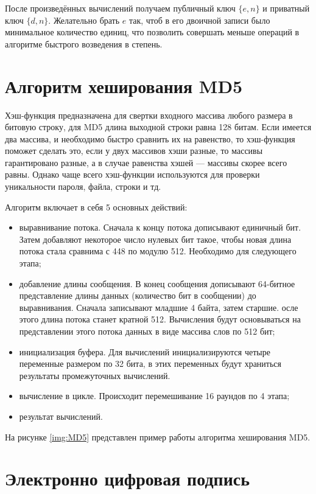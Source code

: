 После произведённых вычислений получаем публичный ключ $\{e, n\}$ и приватный ключ $\{d, n\}$. Желательно брать $e$ так, чтоб в его двоичной записи было минимальное количество единиц, что позволить совершать меньше операций в алгоритме быстрого возведения в степень.

\section{Алгоритм хеширования MD5}

Хэш-функция предназначена для свертки входного массива любого размера в битовую строку, для MD5 длина выходной строки равна 128 битам. Если имеется два массива, и необходимо быстро сравнить их на равенство, то хэш-функция поможет сделать это, если у двух массивов хэши разные, то массивы гарантировано разные, а в случае равенства хэшей --- массивы скорее всего равны. Однако чаще всего хэш-функции используются для проверки уникальности пароля, файла, строки и тд.

Алгоритм включает в себя 5 основных действий:

\begin{itemize}[label=---]
    \item выравнивание потока. Сначала к концу потока дописывают единичный бит. Затем добавляют некоторое число нулевых бит такое, чтобы новая длина потока стала сравнима с 448 по модулю 512. Необходимо для следующего этапа;
    \item добавление длины сообщения. В конец сообщения дописывают 64-битное представление длины данных (количество бит в сообщении) до выравнивания. Сначала записывают младшие 4 байта, затем старшие. осле этого длина потока станет кратной 512. Вычисления будут основываться на представлении этого потока данных в виде массива слов по 512 бит;
    \item инициализация буфера. Для вычислений инициализируются четыре переменные размером по 32 бита, в этих переменных будут храниться результаты промежуточных вычислений.
    \item вычисление в цикле. Происходит перемешивание 16 раундов по 4 этапа;
    \item результат вычислений.
\end{itemize}

На рисунке \ref{img:MD5} представлен пример работы алгоритма хеширования MD5.

\clearpage

\section{Электронно цифровая подпись}

